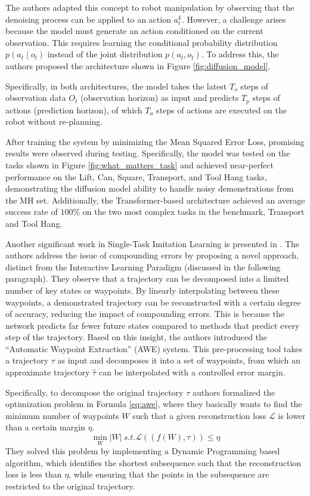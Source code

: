 The authors adapted this concept to robot manipulation by observing that the denoising process can be applied to an action $a_{t}^{k}$. However, a challenge arises because the model must generate an action conditioned on the current observation. This requires learning the conditional probability distribution $p(a_t \mid o_t)$ instead of the joint distribution $p(a_t, o_t)$. To address this, the authors proposed the architecture shown in Figure \ref{fig:diffusion_model}.


Specifically, in both architectures, the model takes the latest $T_o$ steps of observation data $O_t$ (observation horizon) as input and predicts $T_p$ steps of actions (prediction horizon), of which $T_a$ steps of actions are executed on the robot without re-planning.

After training the system by minimizing the Mean Squared Error Loss, promising results were observed during testing. Specifically, the model was tested on the tasks shown in Figure \ref{fig:what_matters_task} and achieved near-perfect performance on the Lift, Can, Square, Transport, and Tool Hang tasks, demonstrating the diffusion model ability to handle noisy demonstrations from the MH set. Additionally, the Transformer-based architecture achieved an average success rate of $100\%$ on the two most complex tasks in the benchmark, Transport and Tool Hang.

Another significant work in Single-Task Imitation Learning is presented in \cite{shi2023waypoint}. The authors address the issue of compounding errors by proposing a novel approach, distinct from the Interactive Learning Paradigm (discussed in the following paragraph). They observe that a trajectory can be decomposed into a limited number of key states or waypoints. By linearly interpolating between these waypoints, a demonstrated trajectory can be reconstructed with a certain degree of accuracy, reducing the impact of compounding errors. This is because the network predicts far fewer future states compared to methods that predict every step of the trajectory. Based on this insight, the authors introduced the ``Automatic Waypoint Extraction'' (AWE) system. This pre-processing tool takes a trajectory $\tau$ as input and decomposes it into a set of waypoints, from which an approximate trajectory $\hat{\tau}$ can be interpolated with a controlled error margin.

Specifically, to decompose the original trajectory $\tau$ authors formalized the optimization problem in Formula \ref{eq:awe}, where they basically wants to find the minimum number of waypoints $W$ such that a given reconstruction loss $\mathcal{L}$ is lower than a certain margin $\eta$.
\begin{equation}
    \label{eq:awe}
    \min_{W} |W|  \ s.t. \mathcal{L}((f(W), \tau)) \le \eta
\end{equation}
They solved this problem by implementing a Dynamic Programming based algorithm, which identifies the shortest subsequence such that the reconstruction loss is less than $\eta$, while ensuring that the points in the subsequence are restricted to the original trajectory. 

